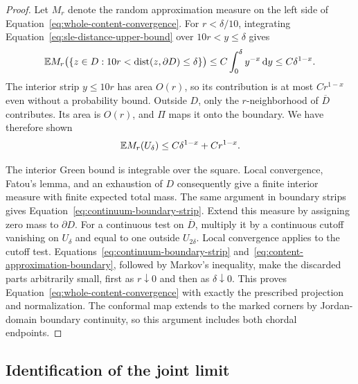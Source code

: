 \begin{proof}
Let $M_r$ denote the random approximation measure on the left side
of Equation~\eqref{eq:whole-content-convergence}.  For $r<\delta/10$,
integrating Equation~\eqref{eq:sle-distance-upper-bound} over
$10r<y\le\delta$ gives
\[
 \mathbb E M_r\bigl(\{z\in D:10r<\operatorname{dist}(z,\partial D)\le\delta\}\bigr)
 \le C\int_0^\delta y^{-x}\,\mathrm d y
 \le C\delta^{1-x}.
\]
The interior strip $y\le10r$ has area $O(r)$, so its contribution is
at most $Cr^{1-x}$ even without a probability bound.  Outside $D$,
only the $r$-neighborhood of $\overline D$ contributes.  Its area is
$O(r)$, and $\Pi$ maps it onto the boundary.  We have therefore shown
\begin{equation}
 \mathbb E M_r(U_\delta)
       \le C\delta^{1-x}+Cr^{1-x}.
 \label{eq:content-approximation-boundary}
\end{equation}

The interior Green bound is integrable over the square.  Local
convergence, Fatou's lemma, and an exhaustion of $D$ consequently
give a finite interior measure with finite expected total mass.
The same argument in boundary strips gives
Equation~\eqref{eq:continuum-boundary-strip}.  Extend this measure
by assigning zero mass to $\partial D$.  For a continuous test on
$\overline D$, multiply it by a continuous cutoff vanishing on
$U_\delta$ and equal to one outside $U_{2\delta}$.  Local convergence
applies to the cutoff test.  Equations~\eqref{eq:continuum-boundary-strip}
and~\eqref{eq:content-approximation-boundary}, followed by Markov's
inequality, make the discarded parts arbitrarily small, first as
$r\downarrow0$ and then as $\delta\downarrow0$.
This proves Equation~\eqref{eq:whole-content-convergence} with exactly
the prescribed projection and normalization.  The conformal map
extends to the marked corners by Jordan-domain boundary continuity,
so this argument includes both chordal endpoints.
\end{proof}

\subsection{Identification of the joint limit}

